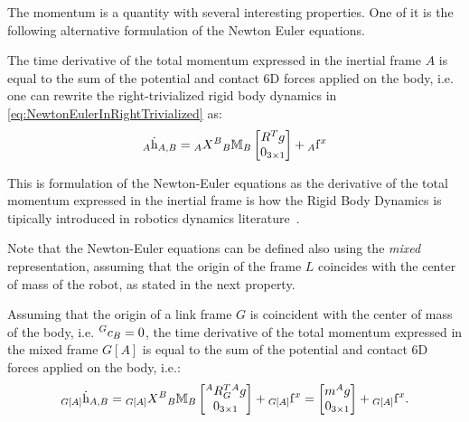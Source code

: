 
The momentum is a quantity with several interesting properties. One of it is the following alternative formulation of the Newton Euler equations.

\begin{lemma}
The time derivative of the total momentum expressed in the inertial frame $A$ is equal to the sum of the potential and contact 6D forces applied on the body, i.e. one can rewrite the right-trivialized rigid body dynamics in \eqref{eq:NewtonEulerInRightTrivialized} as:
\begin{equation}
\hspace{0em}_A \dot{\mathrm{h}}_{A,B} = \hspace{0em}_A X^B \hspace{0em}_B \mathbb{M}_B \begin{bmatrix} R^T g \\ 0_{3 \times 1} \end{bmatrix} + \hspace{0em}_A {\rm f}^x 
\end{equation}
\end{lemma}

This is formulation of the Newton-Euler equations as the derivative of the total momentum expressed in the inertial frame is how the Rigid Body Dynamics is tipically introduced in robotics dynamics literature~\citep{featherstone2008}.

Note that the Newton-Euler equations can be defined also using the \emph{mixed} representation, assuming that the origin of the frame $L$ coincides with the center of mass of the robot, as stated in the next property.
\begin{lemma}
Assuming that the origin of a link frame $G$ is coincident with the center of mass of the body, i.e. $ \hspace{0em}^G c_B = 0$, the time derivative of the total momentum expressed in the mixed frame $G[A]$ is equal to the sum of the potential and contact 6D forces applied on the body, i.e.:
\begin{equation}
\hspace{0em}_{G[A]} \dot{\mathrm{h}}_{A,B} = 
\hspace{0em}_{G[A]} X^B \hspace{0em}_B \mathbb{M}_B \begin{bmatrix} \hspace{0em}^A R^T_G \hspace{0em}^A g \\ 0_{3 \times 1} \end{bmatrix} + \hspace{0em}_{G[A]} {\rm f}^x  = 
\begin{bmatrix} m \hspace{0em}^A g \\ 0_{3 \times 1} \end{bmatrix} + \hspace{0em}_{G[A]} {\rm f}^x .
\end{equation}
\end{lemma}

